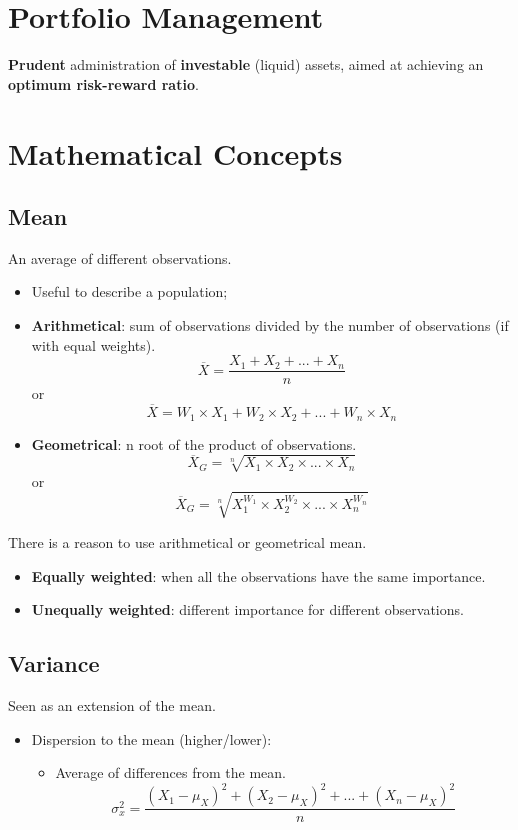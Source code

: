 \documentclass[11pt,a4paper]{report}
\begin{document}
\section{Portfolio Management}
\textbf{Prudent} administration of \textbf{investable} (liquid) assets, aimed at achieving an \textbf{optimum risk-reward ratio}.

\section{Mathematical Concepts}
\subsection{Mean} An average of different observations.
\begin{itemize}
    \item Useful to describe a population;
    \item \textbf{Arithmetical}: sum of observations divided by the number of observations (if with equal weights).
    \[\overline{X} = \frac{X_1 + X_2 + ... + X_n}{n}\]
    or
    \[\overline{X} = W_1 \times X_1 + W_2 \times X_2 + ... + W_n \times X_n\]
    \item \textbf{Geometrical}: n root of the product of observations.
    \[\overline{X}_G = \sqrt[n]{X_1 \times X_2 \times ... \times X_n}\]
    or
    \[\overline{X}_G = \sqrt[n]{X_1^{W_1} \times X_2^{W_2} \times ... \times X_n^{W_n}} \]
\end{itemize}
There is a reason to use arithmetical or geometrical mean.
\begin{itemize}
    \item \textbf{Equally weighted}: when all the observations have the same importance.
    \item \textbf{Unequally weighted}: different importance for different observations.
\end{itemize}

\subsection{Variance} Seen as an extension of the mean.
\begin{itemize}
    \item Dispersion to the mean (higher/lower):
    \begin{itemize}
        \item Average of differences from the mean.
        \[\sigma_x^2 = \frac{(X_1 - \mu_X)^2 + (X_2 - \mu_X)^2 + ... + (X_n - \mu_X)^2}{n}\]
    \end{itemize}
    
\end{itemize}
\end{document}

